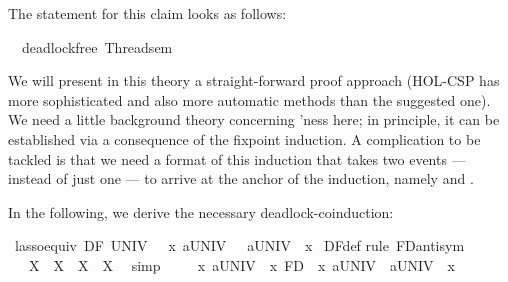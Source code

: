 \begin{isabellebody}
\begin{isamarkuptext}
The statement for this claim looks as follows:%
\end{isamarkuptext}\isamarkuptrue%
\isamarkupfalse%
\ \ {\isacartoucheopen}deadlock{\isacharunderscore}{\kern0pt}free\ Thread{}{\isacharunderscore}{\kern0pt}sem{\isacartoucheclose}%
\begin{isamarkuptext}%
We will present in this theory a straight-forward proof approach (HOL-CSP has more
sophisticated and also more automatic methods than the suggested one). We need a little
background theory concerning 'ness here; in principle, it can be 
established via a consequence of the fixpoint induction. A complication to be tackled
is that we need a format of this induction that takes two events --- instead of just one ---
to arrive at the anchor of the induction, namely  and .%
\end{isamarkuptext}\isamarkuptrue%
%
\isadelimdocument
%
\endisadelimdocument
%
\isatagdocument
%
\isamarkuptrue%
%
\endisatagdocument
{\isafolddocument}%
%
\isadelimdocument
%
\endisadelimdocument
%
\begin{isamarkuptext}%
In the following, we derive the necessary deadlock-coinduction:%
\end{isamarkuptext}\isamarkuptrue%
\isamarkupfalse%
\ lasso{\isacharunderscore}{\kern0pt}equiv{}{\isacharcolon}{\kern0pt}\ {\isachardoublequoteopen}DF\ UNIV\ {\isacharequal}{\kern0pt}\ {\isacharparenleft}{\kern0pt}{\isasymmu}\ x{\isachardot}{\kern0pt}\ {\isasymsqinter}a{\isasymin}UNIV\ {\isasymrightarrow}\ \ {\isasymsqinter}a{\isasymin}UNIV\ {\isasymrightarrow}\ x{\isacharparenright}{\kern0pt}{\isachardoublequoteclose}\isanewline
%
\isadelimproof
%
\endisadelimproof
%
\isatagproof
{}\isamarkupfalse%
\ DF{\isacharunderscore}{\kern0pt}def\isanewline
{}\isamarkupfalse%
{\isacharparenleft}{\kern0pt}rule\ FD{\isacharunderscore}{\kern0pt}antisym{\isacharparenright}{\kern0pt}\isanewline
\ \ \isamarkupfalse%
\ {\isacharasterisk}{\kern0pt}\ {\isacharcolon}{\kern0pt}\ {\isacartoucheopen}X\ {\isacharequal}{\kern0pt}\ {\isacharparenleft}{\kern0pt}X\ {\isasymand}\ X{\isacharparenright}{\kern0pt}{\isacartoucheclose}\ \ X\ \isamarkupfalse%
\ simp\isanewline
\ \ \isamarkupfalse%
\ {\isacartoucheopen}{\isacharparenleft}{\kern0pt}{\isasymmu}\ x{\isachardot}{\kern0pt}\ {\isasymsqinter}a{\isasymin}UNIV\ {\isasymrightarrow}\ x{\isacharparenright}{\kern0pt}\ {\isasymsqsubseteq}\isactrlsub F\isactrlsub D\ {\isacharparenleft}{\kern0pt}{\isasymmu}\ x{\isachardot}{\kern0pt}\ {\isasymsqinter}a{\isasymin}UNIV\ {\isasymrightarrow}\ {\isasymsqinter}a{\isasymin}UNIV\ {\isasymrightarrow}\ x{\isacharparenright}{\kern0pt}{\isacartoucheclose}\isanewline

\end{isabellebody}

